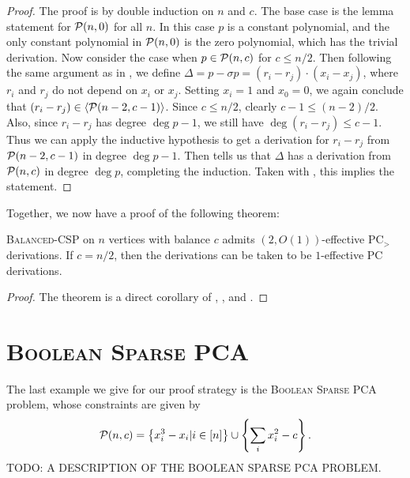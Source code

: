 \begin{proof}
The proof is by double induction on $n$ and $c$. The base case is the lemma statement for $\mathcal P(n,0)$ for all $n$. In this case $p$ is a constant polynomial, and the only constant polynomial in $\mathcal P(n,0)$ is the zero polynomial, which has the trivial derivation. Now consider the case when $p \in \mathcal P(n,c)$ for $c \leq n/2$. Then following the same argument as in , we define $\Delta = p - \sigma p = (r_i - r_j)\cdot (x_i - x_j)$, where $r_i$ and $r_j$ do not depend on $x_i$ or $x_j$. Setting $x_i = 1$ and $x_0 = 0$, we again conclude that $(r_i - r_j) \in \langle \mathcal P(n-2,c-1) \rangle$. Since $c \leq n/2$, clearly $c-1 \leq (n-2)/2$. Also, since $r_i - r_j$ has degree $\deg p - 1$, we still have $\deg (r_i - r_j) \leq c-1$. Thus we can apply the inductive hypothesis to get a derivation for $r_i - r_j$ from $\mathcal P(n-2,c-1)$ in degree $\deg p - 1$. Then  tells us that $\Delta$ has a derivation from $\mathcal P(n,c)$ in degree $\deg p$, completing the induction. Taken with , this implies the statement. 
\end{proof}
Together, we now have a proof of the following theorem:
\begin{theorem}
\textsc{Balanced-CSP} on $n$ vertices with balance $c$ admits $(2,O(1))$-effective PC$_>$ derivations. If $c = n/2$, then the derivations can be taken to be $1$-effective PC derivations.
\end{theorem}
\begin{proof}
The theorem is a direct corollary of , , and .
\end{proof}

\section{\textsc{Boolean Sparse PCA}}
The last example we give for our proof strategy is the \textsc{Boolean Sparse PCA} problem, whose constraints are given by 
\begin{align}
\mathcal P(n,c) = \left\{x_i^3 - x_i | i \in [n]\right\} \cup \left\{\sum_i x_i^2 - c\right\}.\label{eq:bspca-formulation}
\end{align}
TODO: A DESCRIPTION OF THE BOOLEAN SPARSE PCA PROBLEM.

